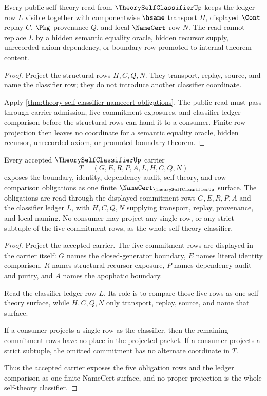 \begin{theorem}
\label{thm:theoryselfclassifier-ledger-obligation}
Every public self-theory read from $\TheorySelfClassifierUp$ keeps the ledger row $L$ visible together with componentwise $\hsame$ transport $H$, displayed $\Cont$ replay $C$, $\Pkg$ provenance $Q$, and local $\NameCert$ row $N$. The read cannot replace $L$ by a hidden semantic equality oracle, hidden recursor supply, unrecorded axiom dependency, or boundary row promoted to internal theorem content.
\end{theorem}
\begin{proof}
Project the structural rows $H,C,Q,N$. They transport, replay, source, and name the classifier row; they do not introduce another classifier coordinate.

Apply \autoref{thm:theory-self-classifier-namecert-obligations}. The public read must pass through carrier admission, five commitment exposures, and classifier-ledger comparison before the structural rows can hand it to a consumer. Finite row projection then leaves no coordinate for a semantic equality oracle, hidden recursor, unrecorded axiom, or promoted boundary theorem.
\end{proof}

\begin{theorem}
\label{thm:theory-self-classifier-obligation-triple}
Every accepted $\TheorySelfClassifierUp$ carrier
$$
T=(G,E,R,P,A,L,H,C,Q,N)
$$
exposes the boundary, identity, dependency-audit, self-theory, and row-comparison obligations as one finite $\NameCert_{\TheorySelfClassifierUp}$ surface. The obligations are read through the displayed commitment rows $G,E,R,P,A$ and the classifier ledger $L$, with $H,C,Q,N$ supplying transport, replay, provenance, and local naming. No consumer may project any single row, or any strict subtuple of the five commitment rows, as the whole self-theory classifier.
\end{theorem}
\begin{proof}
Project the accepted carrier. The five commitment rows are displayed in the carrier itself: $G$ names the closed-generator boundary, $E$ names literal identity comparison, $R$ names structural recursor exposure, $P$ names dependency audit and purity, and $A$ names the apophatic boundary.

Read the classifier ledger row $L$. Its role is to compare those five rows as one self-theory surface, while $H,C,Q,N$ only transport, replay, source, and name that surface.

If a consumer projects a single row as the classifier, then the remaining commitment rows have no place in the projected packet. If a consumer projects a strict subtuple, the omitted commitment has no alternate coordinate in $T$.

Thus the accepted carrier exposes the five obligation rows and the ledger comparison as one finite NameCert surface, and no proper projection is the whole self-theory classifier.
\end{proof}


